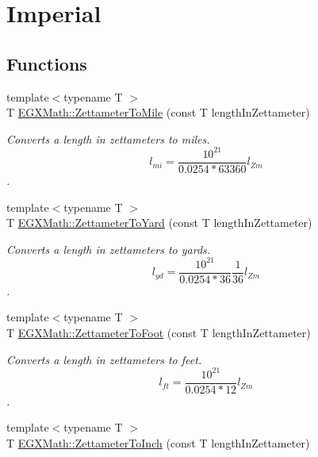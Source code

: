 \hypertarget{group___e_g_x_math-_conversions-_length_conversions-_zettameter-_imperial}{}\section{Imperial}
\label{group___e_g_x_math-_conversions-_length_conversions-_zettameter-_imperial}
\subsection*{Functions}
\begin{DoxyCompactItemize}
\item 
{\footnotesize template$<$typename T $>$ }\\T \mbox{\hyperlink{group___e_g_x_math-_conversions-_length_conversions-_zettameter-_imperial_ga217b12dd9c920150cbcf50413e98dd47}{E\+G\+X\+Math\+::\+Zettameter\+To\+Mile}} (const T length\+In\+Zettameter)
\begin{DoxyCompactList}\small\item\em Converts a length in zettameters to miles. \[ l_{mi}=\frac{10^{21}}{0.0254 * 63360} l_{Zm} \]. \end{DoxyCompactList}\item 
{\footnotesize template$<$typename T $>$ }\\T \mbox{\hyperlink{group___e_g_x_math-_conversions-_length_conversions-_zettameter-_imperial_gaf0f61cf5764afa5022579c2e638a0c2e}{E\+G\+X\+Math\+::\+Zettameter\+To\+Yard}} (const T length\+In\+Zettameter)
\begin{DoxyCompactList}\small\item\em Converts a length in zettameters to yards. \[ l_{yd}= \frac{10^{21}}{0.0254 * 36} \frac{1}{36} l_{Zm} \]. \end{DoxyCompactList}\item 
{\footnotesize template$<$typename T $>$ }\\T \mbox{\hyperlink{group___e_g_x_math-_conversions-_length_conversions-_zettameter-_imperial_ga2b64ad3efd85a1800a76661d05487a09}{E\+G\+X\+Math\+::\+Zettameter\+To\+Foot}} (const T length\+In\+Zettameter)
\begin{DoxyCompactList}\small\item\em Converts a length in zettameters to feet. \[ l_{ft}= \frac{10^{21}}{0.0254 * 12} l_{Zm} \]. \end{DoxyCompactList}\item 
{\footnotesize template$<$typename T $>$ }\\T \mbox{\hyperlink{group___e_g_x_math-_conversions-_length_conversions-_zettameter-_imperial_gada0a88ddbf198ca1828b6c39fda34f2c}{E\+G\+X\+Math\+::\+Zettameter\+To\+Inch}} (const T length\+In\+Zettameter)

\end{DoxyCompactItemize}
